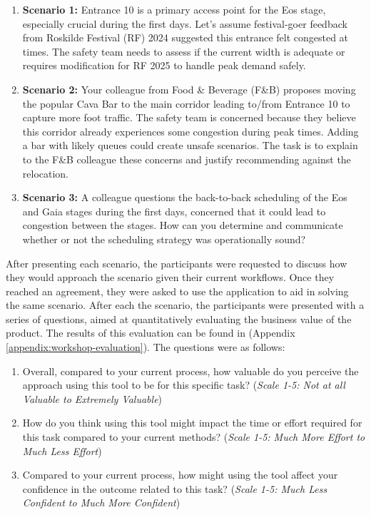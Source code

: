\begin{enumerate}
  \item \textbf{Scenario 1:} Entrance 10 is a primary access point for the Eos stage, especially crucial during the first days. Let's assume festival-goer feedback from Roskilde Festival (RF) 2024 suggested this entrance felt congested at times. The safety team needs to assess if the current width is adequate or requires modification for RF 2025 to handle peak demand safely.
  \item \textbf{Scenario 2:} Your colleague from Food \& Beverage (F\&B) proposes moving the popular Cava Bar to the main corridor leading to/from Entrance 10 to capture more foot traffic. The safety team is concerned because they believe this corridor already experiences some congestion during peak times. Adding a bar with likely queues could create unsafe scenarios. The task is to explain to the F\&B colleague these concerns and justify recommending against the relocation.
  \item \textbf{Scenario 3:} A colleague questions the back-to-back scheduling of the Eos and Gaia stages during the first days, concerned that it could lead to congestion between the stages. How can you determine and communicate whether or not the scheduling strategy was operationally sound?
\end{enumerate}

After presenting each scenario, the participants were requested to discuss how they would approach the scenario given their current workflows. Once they reached an agreement, they were asked to use the application to aid in solving the same scenario. After each the scenario, the participants were presented with a series of questions, aimed at quantitatively evaluating the business value of the product. The results of this evaluation can be found in (Appendix \ref{appendix:workshop-evaluation}). The questions were as follows:

\begin{enumerate}
  \item Overall, compared to your current process, how valuable do you perceive the approach using this tool to be for this specific task? (\textit{Scale 1-5: Not at all Valuable to Extremely Valuable})
  \item How do you think using this tool might impact the time or effort required for this task compared to your current methods? (\textit{Scale 1-5: Much More Effort to Much Less Effort})
  \item Compared to your current process, how might using the tool affect your confidence in the outcome related to this task? (\textit{Scale 1-5: Much Less Confident to Much More Confident})
\end{enumerate}

